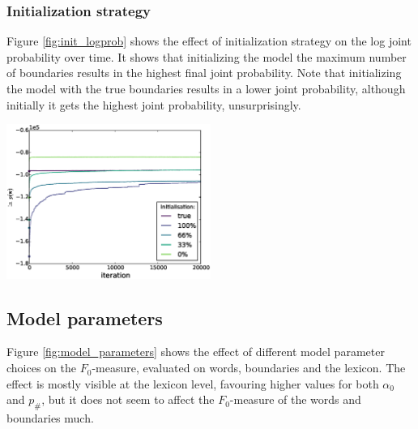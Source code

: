 \subsubsection{Initialization strategy}

Figure \ref{fig:init_logprob} shows the effect of initialization strategy on the log joint probability over time. It shows that initializing the model the maximum number of boundaries results in the highest final joint probability. Note that initializing the model with the true boundaries results in a lower joint probability, although initially it gets the highest joint probability, unsurprisingly.

\begingroup
    \centering
    \includegraphics[width=0.5\textwidth]{images/initialisation-log_prob}
    \label{fig:init_logprob}
\endgroup

\subsection{Model parameters}

Figure \ref{fig:model_parameters} shows the effect of different model parameter choices on the $F_0$-measure, evaluated on words, boundaries and the lexicon. The effect is mostly visible at the lexicon level, favouring higher values for both $\alpha_0$ and $p_\#$, but it does not seem to affect the $F_0$-measure of the words and boundaries much.


